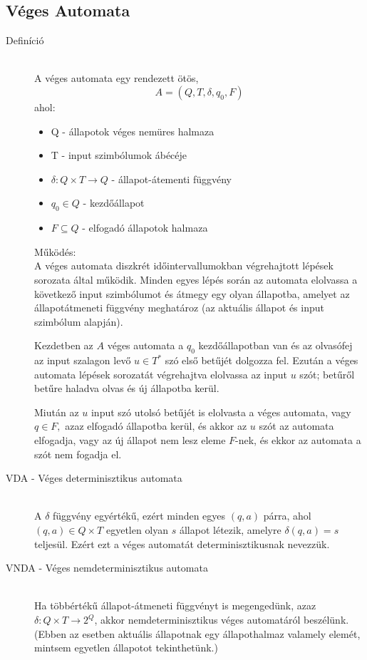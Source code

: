 \documentclass[margin=0px]{article}
\begin{document}
\subsection{Véges Automata}
\begin{description}
    \item[Definíció] \hfill \\
        A véges automata egy rendezett ötös,
        \[A=(Q,T,\delta,q_0, F)\]
        ahol:
        \begin{itemize}
            \item Q - állapotok véges nemüres halmaza
            \item T - input szimbólumok ábécéje
            \item $\delta : Q \times T \rightarrow Q$ - állapot-átementi függvény
            \item $q_0 \in Q$ - kezdőállapot
            \item $F \subseteq Q$ - elfogadó állapotok halmaza
        \end{itemize}

        Működés:\\
        A véges automata diszkrét időintervallumokban végrehajtott lépések sorozata által működik. Minden egyes lépés során az automata elolvassa a következő input szimbólumot és átmegy egy olyan állapotba, amelyet az állapotátmeneti függvény meghatároz (az aktuális állapot és input szimbólum alapján).

        Kezdetben az $A$ véges automata a $q_0$ kezdőállapotban van és az olvasófej az input szalagon levő $u \in T^*$ szó első betűjét dolgozza fel. Ezután a véges automata lépések sorozatát végrehajtva elolvassa az input $u$ szót; betűről betűre haladva olvas és új állapotba kerül.

        Miután az $u$ input szó utolsó betűjét is elolvasta a véges automata, vagy $q \in F,$ azaz elfogadó állapotba kerül, és akkor az $u$ szót az automata elfogadja, vagy az új állapot nem lesz eleme $F$-nek, és ekkor az automata a szót nem fogadja el.


    \item[VDA - Véges determinisztikus automata] \hfill \\
        A $\delta$ függvény egyértékű, ezért minden egyes $(q, a)$ párra, ahol $(q, a) \in Q \times T$ egyetlen olyan $s$ állapot létezik, amelyre $\delta(q, a) = s$ teljesül. Ezért ezt a véges automatát determinisztikusnak nevezzük.
    \item[VNDA - Véges nemdeterminisztikus automata] \hfill \\
        Ha többértékű állapot-átmeneti függvényt is megengedünk, azaz $\delta : Q \times T \rightarrow 2^Q$, akkor nemdeterminisztikus véges automatáról beszélünk. (Ebben az esetben aktuális állapotnak egy állapothalmaz valamely elemét, mintsem egyetlen állapotot tekinthetünk.)


\end{description}
\end{document}
